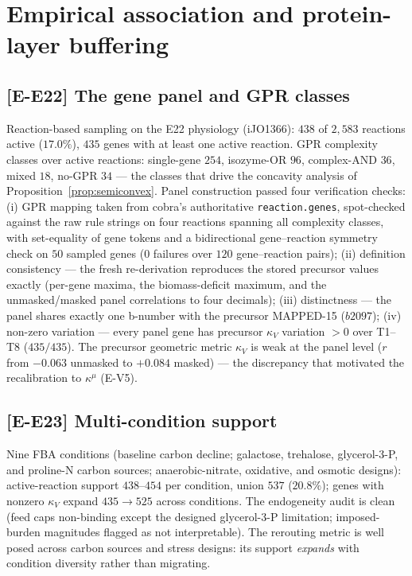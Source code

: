 \documentclass[11pt,a4paper]{article}
\theoremstyle{plain}
\theoremstyle{definition}
\theoremstyle{remark}
\newcommand{\kk}{\kappa_{\!V}}
\newcommand{\kmu}{\kappa^{\mu}}
\begin{document}
\section{Empirical association and protein-layer buffering}
\label{sec:empirical}


\subsection{[E-E22] The gene panel and GPR classes}
Reaction-based sampling on the E22 physiology (iJO1366): $438$ of
$2{,}583$ reactions active ($17.0\%$), $435$ genes with at least one
active reaction. GPR complexity classes over active reactions:
single-gene $254$, isozyme-OR $96$, complex-AND $36$, mixed $18$,
no-GPR $34$ --- the classes that drive the concavity analysis of
Proposition~\ref{prop:semiconvex}. Panel construction passed four
verification checks: (i) GPR mapping taken from cobra's authoritative
\texttt{reaction.genes}, spot-checked against the raw rule strings on
four reactions spanning all complexity classes, with set-equality of
gene tokens and a bidirectional gene--reaction symmetry check on $50$
sampled genes ($0$ failures over $120$ gene--reaction pairs); (ii)
definition consistency --- the fresh re-derivation reproduces the
stored precursor values exactly (per-gene maxima, the biomass-deficit
maximum, and the unmasked/masked panel correlations to four
decimals); (iii) distinctness --- the panel shares exactly one
b-number with the precursor MAPPED-15 ($b2097$); (iv) non-zero variation ---
every panel gene has precursor $\kappa_V$ variation $> 0$ over T1--T8
($435/435$). The precursor geometric metric $\kk$ is weak at the panel
level ($r$ from $-0.063$ unmasked to $+0.084$ masked) --- the
discrepancy that motivated the recalibration to $\kmu$ (E-V5).

\subsection{[E-E23] Multi-condition support}
Nine FBA conditions (baseline carbon decline; galactose, trehalose,
glycerol-3-P, and proline-N carbon sources; anaerobic-nitrate,
oxidative, and osmotic designs): active-reaction support $438$--$454$
per condition, union $537$ ($20.8\%$); genes with nonzero $\kk$
expand $435 \to 525$ across conditions. The endogeneity audit is
clean (feed caps non-binding except the designed glycerol-3-P
limitation; imposed-burden magnitudes flagged as not interpretable).
The rerouting metric is well posed across carbon sources and stress
designs: its support \emph{expands} with condition diversity rather
than migrating.
\end{document}

